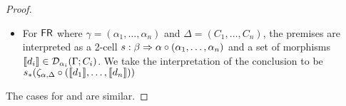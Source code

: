 \begin{proof}
\begin{itemize}
\item For $\mathsf{FR}$
where $\gamma = (\alpha_1, \dots, \alpha_n)$ and $\Delta = (C_1, \dots,
C_n)$, the premises are interpreted as a 2-cell $s : \beta \Rightarrow
{\alpha} \circ {(\alpha_1,\ldots,\alpha_n)}$ and a set of morphisms $\llbracket
d_i \rrbracket \in \mathcal{D}_{\alpha_i}(\Gamma; C_i)$. We take the interpretation of
the conclusion to be $s_*(\zeta_{\alpha, \Delta} \circ (\llbracket d_1 \rrbracket,
\dots, \llbracket d_n \rrbracket))$

\end{itemize}
The cases for \UL\/ and \UR\/ are similar.  
\end{proof}

